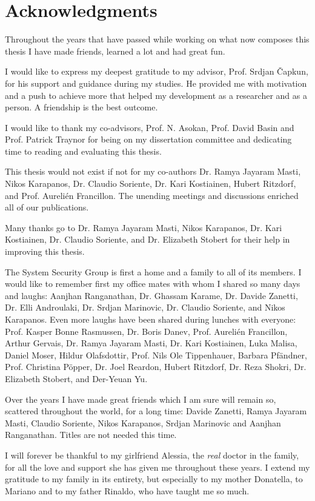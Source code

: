 \chapter*{Acknowledgments}

Throughout the years that have passed while working on what now composes this thesis I have made friends, learned a lot and had great fun.

I would like to express my deepest gratitude to my advisor, Prof. Srdjan \v{C}apkun, for his support and guidance during my studies. He provided me with motivation and a push to achieve more that helped my development as a researcher and as a person. A friendship is the best outcome.

I would like to thank my co-advisors, Prof. N. Asokan, Prof. David Basin and Prof. Patrick Traynor for being on my dissertation committee and dedicating time to reading and evaluating this thesis.

This thesis would not exist if not for my co-authors Dr. Ramya Jayaram Masti, Nikos Karapanos, Dr. Claudio Soriente, Dr. Kari Kostiainen, Hubert Ritzdorf, and Prof. Aureli\'{e}n Francillon. The unending meetings and discussions enriched all of our publications.

Many thanks go to Dr. Ramya Jayaram Masti, Nikos Karapanos, Dr. Kari Kostiainen, Dr. Claudio Soriente, and Dr. Elizabeth Stobert for their help in improving this thesis.

The System Security Group is first a home and a family to all of its members. I would like to remember first my office mates with whom I shared so many days and laughs: Aanjhan Ranganathan, Dr. Ghassam Karame, Dr. Davide Zanetti, Dr. Elli Androulaki, Dr. Srdjan Marinovic, Dr. Claudio Soriente, and Nikos Karapanos. Even more laughs have been shared during lunches with everyone: 
Prof. Kasper Bonne Rasmussen,
Dr. Boris Danev,
Prof. Aureli\'{e}n Francillon,
Arthur Gervais,
Dr. Ramya Jayaram Masti,
Dr. Kari Kostiainen,
Luka Malisa,
Daniel Moser,
Hildur Olafsdottir,
Prof. Nils Ole Tippenhauer,
Barbara Pf\"{a}ndner,
Prof. Christina P\"{o}pper,
Dr. Joel Reardon,
Hubert Ritzdorf,
Dr. Reza Shokri,
Dr. Elizabeth Stobert, and
Der-Yeuan Yu.

Over the years I have made great friends which I am sure will remain so, scattered throughout the world, for a long time: Davide Zanetti, Ramya Jayaram Masti, Claudio Soriente, Nikos Karapanos, Srdjan Marinovic and Aanjhan Ranganathan. Titles are not needed this time.

I will forever be thankful to my girlfriend Alessia, the \emph{real} doctor in the family, for all the love and support she has given me throughout these years. I extend my gratitude to my family in its entirety, but especially to my mother Donatella, to Mariano and to my father Rinaldo, who have taught me so much.